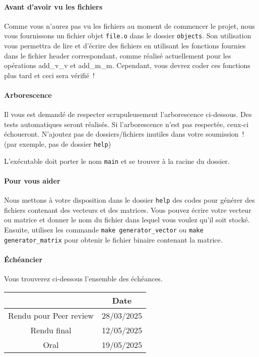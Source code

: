 \documentclass[a4paper, 12pt]{article}
\begin{document}
\paragraph{Avant d'avoir vu les fichiers} Comme vous n'aurez pas vu les fichiers au moment de commencer le projet, nous vous fournissons un fichier objet \texttt{file.o} dans le dossier \texttt{objects}. Son utilisation vous permettra de lire et d'écrire des fichiers en utilisant les fonctions fournies dans le fichier header correspondant, comme réalisé actuellement pour les opérations add\_v\_v et add\_m\_m. Cependant, vous devrez coder ces fonctions plus tard et ceci sera vérifié~!

\paragraph{Arborescence}
Il vous est demandé de respecter scrupuleusement l'arborescence ci-dessous. Des tests automatiques seront réalisés. Si l'arborescence n'est pas respectée, ceux-ci échoueront. N'ajoutez pas de dossiers/fichiers inutiles dans votre soumission~! (par exemple, pas de dossier \texttt{help})

\noindent L'exécutable doit porter le nom \texttt{main} et se trouver à la racine du dossier.

\paragraph{Pour vous aider} Nous mettons à votre disposition dans le dossier \texttt{help} des codes pour générer des fichiers contenant des vecteurs et des matrices. Vous pouvez écrire votre vecteur ou matrice et donner le nom du fichier dans lequel vous voulez qu'il soit stocké. Ensuite, utilisez les commande \texttt{make generator\_vector} ou \texttt{make generator\_matrix} pour obtenir le fichier binaire contenant la matrice.

\paragraph{Échéancier} Vous trouverez ci-dessous l'ensemble des échéances.
\begin{table}[!htb]
\centering
    \begin{tabular}{|c|c|}
        \hline
            & Date\\
        \hline
        Rendu pour Peer review  & 28/03/2025\\
        \hline
        Rendu final & 12/05/2025\\
        \hline
        Oral & 19/05/2025\\
        \hline
    \end{tabular}
\end{table}
\end{document}
